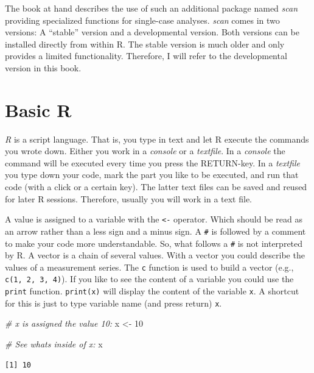 \documentclass[
]{book}
\newenvironment{Shaded}{\begin{snugshade}}{\end{snugshade}}
\newcommand{\CommentTok}[1]{\textcolor[rgb]{0.56,0.35,0.01}{\textit{#1}}}
\newcommand{\DecValTok}[1]{\textcolor[rgb]{0.00,0.00,0.81}{#1}}
\newcommand{\NormalTok}[1]{#1}
\newcommand{\OtherTok}[1]{\textcolor[rgb]{0.56,0.35,0.01}{#1}}
\begin{document}
The book at hand describes the use of such an additional package named \emph{scan} providing specialized functions for single-case analyses. \emph{scan} comes in two versions: A ``stable'' version and a developmental version. Both versions can be installed directly from within R. The stable version is much older and only provides a limited functionality. Therefore, I will refer to the developmental version in this book.

\hypertarget{basic-r}{%
\section{Basic R}\label{basic-r}}

\emph{R} is a script language. That is, you type in text and let R execute the commands you wrote down. Either you work in a \emph{console} or a \emph{textfile}. In a \emph{console} the command will be executed every time you press the RETURN-key. In a \emph{textfile} you type down your code, mark the part you like to be executed, and run that code (with a click or a certain key). The latter text files can be saved and reused for later R sessions. Therefore, usually you will work in a text file.

A value is assigned to a variable with the \texttt{\textless{}-} operator. Which should be read as an arrow rather than a less sign and a minus sign. A \texttt{\#} is followed by a comment to make your code more understandable. So, what follows a \texttt{\#} is not interpreted by R. A vector is a chain of several values. With a vector you could describe the values of a measurement series. The \texttt{c} function is used to build a vector (e.g., \texttt{c(1,\ 2,\ 3,\ 4)}). If you like to see the content of a variable you could use the \texttt{print} function. \texttt{print(x)} will display the content of the variable \texttt{x}. A shortcut for this is just to type variable name (and press return) \texttt{x}.

\begin{Shaded}
\begin{Highlighting}[]
\CommentTok{\# x is assigned the value 10:}
\NormalTok{x }\OtherTok{\textless{}{-}} \DecValTok{10}

\CommentTok{\# See what\textquotesingle{}s inside of x:}
\NormalTok{x}
\end{Highlighting}
\end{Shaded}

\begin{verbatim}
[1] 10
\end{verbatim}
\end{document}
